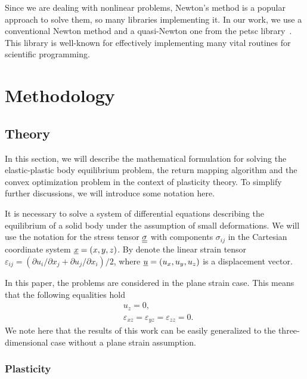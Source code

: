 \documentclass[12pt]{article}
\begin{document}
Since we are dealing with nonlinear problems, Newton's method is a popular approach to solve them, so many libraries implementing it. In our work, we use a conventional Newton method and a quasi-Newton one from the petsc library~\parencite{petsc-user-ref}. This library is well-known for effectively implementing many vital routines for scientific programming. 

\newpage
\section{Methodology}

\subsection{Theory}
\label{sec:theory}

In this section, we will describe the mathematical formulation for solving the elastic-plastic body equilibrium problem, the return mapping algorithm and the convex optimization problem in the context of plasticity theory. To simplify further discussions, we will introduce some notation here. 

It is necessary to solve a system of differential equations describing the equilibrium of a solid body under the assumption of small deformations. We will use the notation for the stress tensor $\underline{\underline{\sigma}}$ with components $\sigma_{ij}$ in the Cartesian coordinate system $\underline{x} = (x, y, z)$. By denote the linear strain tensor $\varepsilon_{ij}=(\partial u_i/\partial x_j+\partial u_j/\partial x_i)/2$, where $\underline{u}=(u_x, u_y, u_z)$ is a displacement vector.

In this paper, the problems are considered in the plane strain case. This means that the following equalities hold
\begin{align*}
    & u_z = 0, \\
    & \varepsilon_{xz} = \varepsilon_{yz} = \varepsilon_{zz} = 0. 
\end{align*}
We note here that the results of this work can be easily generalized to the three-dimensional case without a plane strain assumption.

\subsubsection{Plasticity}
\label{sec:theory:plasticity}
\end{document}

